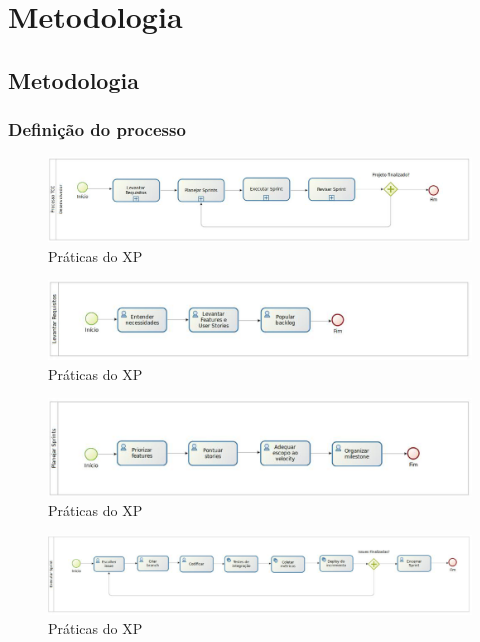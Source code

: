 \part{Metodologia}

\chapter[Metodologia]{Metodologia}

\section{Definição do processo}

\begin{figure}[ht]
	\centering
	\includegraphics[keepaspectratio=true,scale=0.9, width=\textwidth]{figuras/fig06.eps}
	\caption{Práticas do XP \cite{Beck:2004}}
	\label{fig06}
\end{figure}

\begin{figure}[ht]
	\centering
	\includegraphics[keepaspectratio=true,scale=0.9, width=\textwidth]{figuras/fig07.eps}
	\caption{Práticas do XP \cite{Beck:2004}}
	\label{fig07}
\end{figure}

\begin{figure}[ht]
	\centering
	\includegraphics[keepaspectratio=true,scale=0.9, width=\textwidth]{figuras/fig08.eps}
	\caption{Práticas do XP \cite{Beck:2004}}
	\label{fig08}
\end{figure}

\begin{figure}[ht]
	\centering
	\includegraphics[keepaspectratio=true,scale=0.9, width=\textwidth]{figuras/fig09.eps}
	\caption{Práticas do XP \cite{Beck:2004}}
	\label{fig09}
\end{figure}

